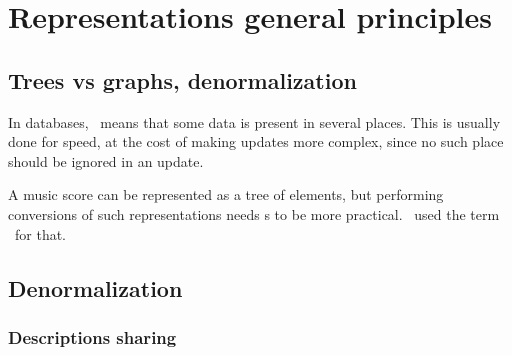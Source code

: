



\chapter{Representations general principles}\label{Representations general principles}


\section{Trees vs graphs, denormalization}

In databases, \denorm\ means that some data is present in several places. This is usually done for speed, at the cost of making updates more complex, since no such place should be ignored in an update.

A music score can be represented as a tree of elements, but performing conversions of such representations needs s to be more practical. \mf\ used the term \link\ for that.


\section{Denormalization}


\subsection{Descriptions sharing}

